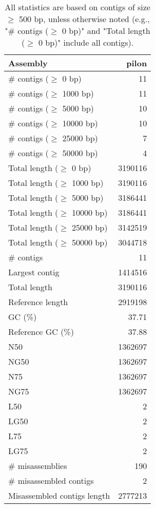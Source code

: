 \documentclass[12pt,a4paper]{article}
\begin{document}
\begin{table}[ht]
\begin{center}
\caption{All statistics are based on contigs of size $\geq$ 500 bp, unless otherwise noted (e.g., "\# contigs ($\geq$ 0 bp)" and "Total length ($\geq$ 0 bp)" include all contigs).}
\begin{tabular}{|l*{1}{|r}|}
\hline
Assembly & pilon \\ \hline
\# contigs ($\geq$ 0 bp) & 11 \\ \hline
\# contigs ($\geq$ 1000 bp) & 11 \\ \hline
\# contigs ($\geq$ 5000 bp) & 10 \\ \hline
\# contigs ($\geq$ 10000 bp) & 10 \\ \hline
\# contigs ($\geq$ 25000 bp) & 7 \\ \hline
\# contigs ($\geq$ 50000 bp) & 4 \\ \hline
Total length ($\geq$ 0 bp) & 3190116 \\ \hline
Total length ($\geq$ 1000 bp) & 3190116 \\ \hline
Total length ($\geq$ 5000 bp) & 3186441 \\ \hline
Total length ($\geq$ 10000 bp) & 3186441 \\ \hline
Total length ($\geq$ 25000 bp) & 3142519 \\ \hline
Total length ($\geq$ 50000 bp) & 3044718 \\ \hline
\# contigs & 11 \\ \hline
Largest contig & 1414516 \\ \hline
Total length & 3190116 \\ \hline
Reference length & 2919198 \\ \hline
GC (\%) & 37.71 \\ \hline
Reference GC (\%) & 37.88 \\ \hline
N50 & 1362697 \\ \hline
NG50 & 1362697 \\ \hline
N75 & 1362697 \\ \hline
NG75 & 1362697 \\ \hline
L50 & 2 \\ \hline
LG50 & 2 \\ \hline
L75 & 2 \\ \hline
LG75 & 2 \\ \hline
\# misassemblies & 190 \\ \hline
\# misassembled contigs & 2 \\ \hline
Misassembled contigs length & 2777213 \\ \hline

\end{tabular}
\end{center}
\end{table}
\end{document}
